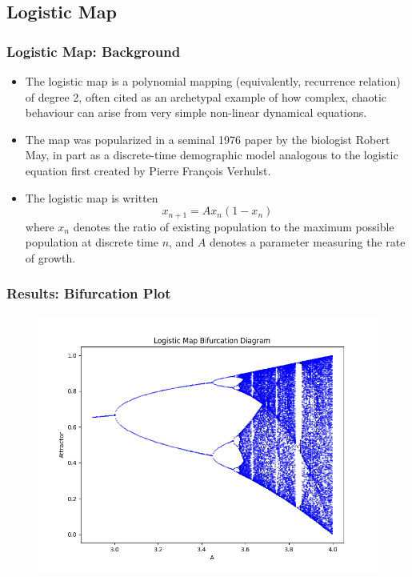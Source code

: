 \documentclass[
	11pt, %
	aspectratio=169, %
]{beamer}
\begin{document}

\subsection{Logistic Map}

\begin{frame}
	\frametitle{Logistic Map: Background}
    
        \begin{itemize}
            \item The logistic map is a polynomial mapping (equivalently, recurrence relation) of degree 2, often cited as an archetypal example of how complex, chaotic behaviour can arise from very simple non-linear dynamical equations. \pause
            \item The map was popularized in a seminal 1976 paper by the biologist Robert May, in part as a discrete-time demographic model analogous to the logistic equation first created by Pierre François Verhulst. \pause
            \item The logistic map is written
            \begin{equation}
                x_{n+1} = Ax_n(1-x_n)
            \end{equation}
            where $x_n$ denotes the ratio of existing population to the maximum possible population at discrete time $n$, and $A$ denotes a parameter measuring the rate of growth.
        \end{itemize}

\end{frame}


\begin{frame}
        \frametitle{Results: Bifurcation Plot}
    \begin{figure}
        \includegraphics[width=0.6\linewidth]{logistic_bifurcation_diagram.png}
    \end{figure}
\end{frame}
\end{document}

